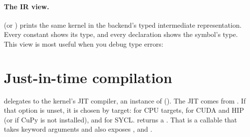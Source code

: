 \paragraph{The IR view.}
 (or ) prints the same kernel in
the backend's typed intermediate representation. Every constant shows its type, and
every declaration shows the symbol's type. This view is most useful when you debug type
errors:

\section{Just-in-time compilation}\label{sec:jit}

 delegates to the kernel's JIT compiler, an instance of
 (). The JIT comes from . If
that option is unset, it is chosen by target:  for CPU targets, 
for CUDA and HIP (or  if CuPy is not installed), and  for SYCL.
 returns a . That is a callable that takes keyword
arguments and also exposes ,  and .

